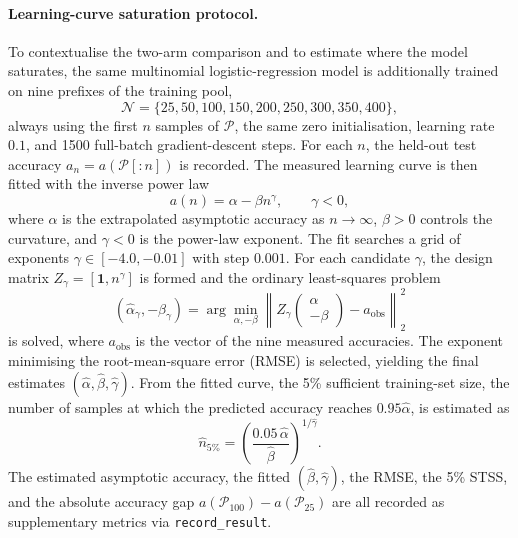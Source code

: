\documentclass{article}
\begin{document}
\paragraph{Learning-curve saturation protocol.}
To contextualise the two-arm comparison and to estimate where the model saturates, the same multinomial logistic-regression model is additionally trained on nine prefixes of the training pool,
\begin{equation}
\mathcal{N} = \{25, 50, 100, 150, 200, 250, 300, 350, 400\},
\end{equation}
always using the first \(n\) samples of \(\mathcal{P}\), the same zero initialisation, learning rate \(0.1\), and 1500 full-batch gradient-descent steps. For each \(n\), the held-out test accuracy \(a_n = a(\mathcal{P}[:n])\) is recorded. The measured learning curve is then fitted with the inverse power law
\begin{equation}
a(n) = \alpha - \beta n^{\gamma}, \qquad \gamma < 0,
\end{equation}
where \(\alpha\) is the extrapolated asymptotic accuracy as \(n \to \infty\), \(\beta > 0\) controls the curvature, and \(\gamma < 0\) is the power-law exponent. The fit searches a grid of exponents \(\gamma \in [-4.0, -0.01]\) with step \(0.001\). For each candidate \(\gamma\), the design matrix \(Z_{\gamma} = [\mathbf{1}, n^{\gamma}]\) is formed and the ordinary least-squares problem
\begin{equation}
(\hat{\alpha}_{\gamma}, -\hat{\beta}_{\gamma}) =
\arg\min_{\alpha, -\beta}
\left\| Z_{\gamma} \begin{pmatrix} \alpha \\ -\beta \end{pmatrix} - a_{\text{obs}} \right\|_2^2
\end{equation}
is solved, where \(a_{\text{obs}}\) is the vector of the nine measured accuracies. The exponent minimising the root-mean-square error (RMSE) is selected, yielding the final estimates \((\hat{\alpha}, \hat{\beta}, \hat{\gamma})\). From the fitted curve, the 5\% sufficient training-set size, the number of samples at which the predicted accuracy reaches \(0.95 \hat{\alpha}\), is estimated as
\begin{equation}
\hat{n}_{5\%} = \left( \frac{0.05 \, \hat{\alpha}}{\hat{\beta}} \right)^{1 / \hat{\gamma}}.
\end{equation}
The estimated asymptotic accuracy, the fitted \((\hat{\beta}, \hat{\gamma})\), the RMSE, the 5\% STSS, and the absolute accuracy gap \(a(\mathcal{P}_{100}) - a(\mathcal{P}_{25})\) are all recorded as supplementary metrics via \texttt{record\_result}.
\end{document}
